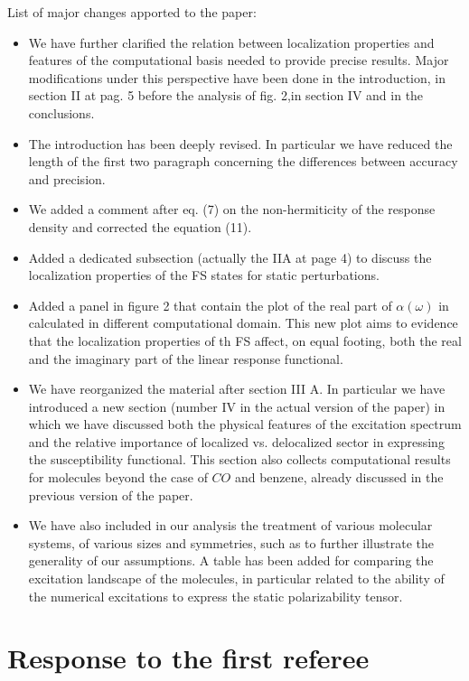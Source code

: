 \documentclass[11pt,a4paper]{article}
\begin{document}

List of major changes apported to the paper:
\begin{itemize}
 \item We have further clarified the relation between localization properties and features of the computational basis needed
 to provide precise results. Major modifications under this perspective have been done in the introduction, in section II at pag. 5 before the analysis of fig. 2,in section IV and in the conclusions.
 \item The introduction has been deeply revised. In particular we have reduced the length of the first two paragraph concerning the differences between accuracy and precision.
 \item We added a comment after eq. (7) on the non-hermiticity of the response density and corrected the equation (11).
 \item Added a dedicated subsection (actually the IIA at page 4)  to discuss the localization properties of the FS states for static perturbations.
 \item Added a panel in figure 2 that contain the plot of the real part of $\alpha(\omega)$ in calculated in different computational domain. This new plot aims to evidence that the localization
 properties of th FS affect, on equal footing, both the real and the imaginary part of the linear response functional.
 \item We have reorganized the material after section III A. In particular we have introduced a new section (number IV in the actual version of the paper) in which we have discussed both the physical features of the excitation spectrum and the relative importance of localized vs. delocalized sector in expressing the susceptibility functional. This section also collects computational results for molecules beyond the case of $CO$ and benzene, already discussed in the previous version of the paper.
 \item We have also included in our analysis the treatment of various molecular systems, of various sizes and symmetries, such as to further illustrate the generality of our assumptions. A table has been added for comparing the excitation landscape of the molecules, in particular related to the ability of the numerical excitations to
 express the static polarizability tensor.
\end{itemize}

\section*{Response to the first referee}
\end{document}
